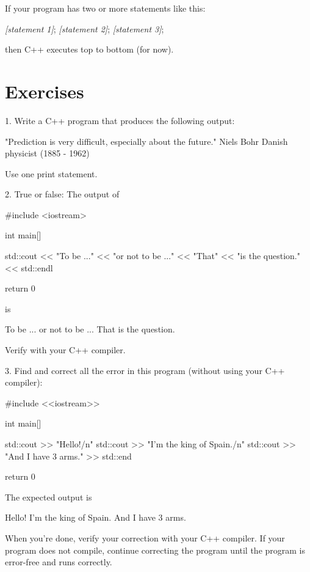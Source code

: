If your program has two or more statements like this:
\begin{console}[frame=none, commandchars=\\\{\}]

        \textit{[statement 1]};
        \textit{[statement 2]};
        \textit{[statement 3]};

\end{console}
then C++ executes top to bottom (for now).





\newpage\section{Exercises}


1. Write a C++ program that produces the following output:
\begin{console}
"Prediction is very difficult, 
especially about the future."
    Niels Bohr
    Danish physicist (1885 - 1962)
\end{console}
Use one print statement.

2. True or false: The output of 
\begin{console}
#include <iostream>

int main[]
{
    std::cout << "To be ..."
              << "or not to be ..."
              << "That" << "is the question." 
              << std::endl

    return 0
}
\end{console}
is
\begin{console}
To be ...  
or not to be ... 
That is the question.
\end{console}
Verify with your C++ compiler.


3. Find and correct 
all the error in this program (without using your C++ compiler):
\begin{console}
#include <<iostream>>

int main[]
{
    std::cout >> "Hello!/n"
    std::cout >> "I’m the king of Spain./n"
    std::cout >> "And I have 3 arms." >> std::end

    return 0
}
\end{console}
The expected output is
\begin{console}
Hello!
I'm the king of Spain.
And I have 3 arms.
\end{console}
When you're done, verify your correction with your C++ compiler. 
If your program does not compile, continue correcting the program 
until the program is error-free and runs correctly.

